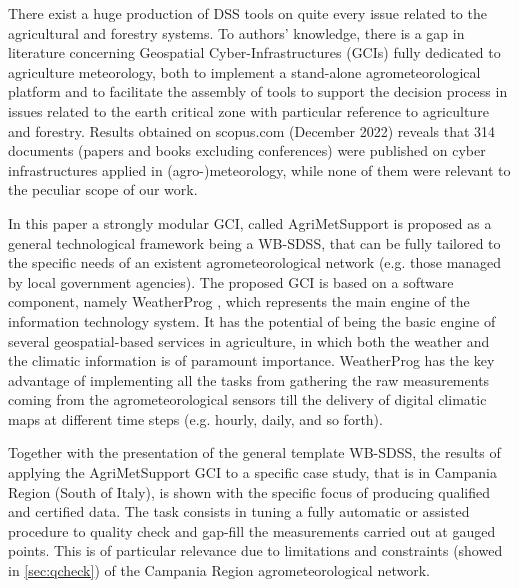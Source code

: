 \documentclass[authoryear,preprint,review,12pt]{elsarticle}
\newcommand{\note}[1]{\emph{\textcolor{red}{#1}}}
\begin{document}
There exist a huge production of DSS tools on quite every issue related to the agricultural and forestry systems.
To authors' knowledge, there is a gap in literature concerning Geospatial Cyber-Infrastructures (GCIs) fully dedicated to agriculture meteorology, both to implement a stand-alone agrometeorological platform and to facilitate the assembly of tools to support the decision process in issues related to the earth critical zone with particular reference to agriculture and forestry. 
Results obtained on scopus.com (December 2022) reveals that 314 documents (papers and books excluding conferences) were published on cyber infrastructures applied in (agro-)meteorology, while none of them were relevant to the peculiar scope of our work.

In this paper a strongly modular GCI, called AgriMetSupport
is proposed as a general technological framework being a WB-SDSS, that can be fully tailored to the specific needs of an existent agrometeorological network (e.g. those managed by local government agencies).
The proposed GCI is based on a software component, namely WeatherProg \citep{langella:weatherprog2014,langella:weatherprog2016}, which represents the main engine of the information technology system.
It has the potential of being the basic engine of several geospatial-based services in agriculture, in which both the weather and the climatic information is of paramount importance.
WeatherProg has the key advantage of implementing all the tasks from gathering the raw measurements coming from the agrometeorological sensors till the delivery of digital climatic maps at different time steps (e.g. hourly, daily, and so forth).

Together with the presentation of the general template WB-SDSS, the results of applying the AgriMetSupport GCI to a specific case study, that is in Campania Region (South of Italy), is shown with the specific focus of producing qualified and certified data.
The task consists in tuning a fully automatic or assisted procedure to quality check and gap-fill the measurements carried out at gauged points.
This is of particular relevance due to limitations and constraints (showed in \cref{sec:qcheck}) of the Campania Region agrometeorological network.
\end{document}
